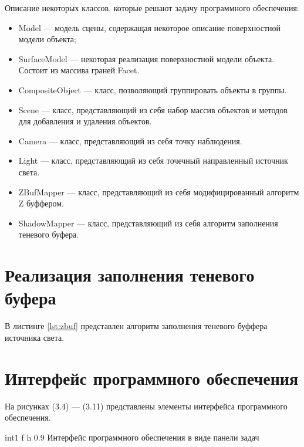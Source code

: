 Описание некоторых классов, которые решают задачу программного обеспечения:
\begin{itemize}
    \item Model --- модель сцены, содержащая некоторое описание поверхностной модели объекта;
    \item SurfaceModel --- некоторая реализация поверхностной модели объекта. Состоит из
        массива граней Facet.
    \item CompositeObject --- класс, позволяющий группировать объекты в группы.
    \item Scene --- класс, представляющий из себя набор массив объектов и методов для
        добавления и удаления объектов.
    \item Camera --- класс, представляющий из себя точку наблюдения.
    \item Light --- класс, представляющий из себя точечный направленный источник света.
    \item ZBufMapper --- класс, представляющий из себя модифицированный алгоритм Z буффером.
    \item ShadowMapper --- класс, представляющий из себя алгоритм заполнения теневого буфера.
\end{itemize}


\section{Реализация заполнения теневого буфера}

В листинге \ref{lst:zbuf} представлен алгоритм заполнения теневого буффера
источника света.

\newpage

\begin{center}
\captionsetup{justification=raggedright,singlelinecheck=off}

\end{center}

\section{Интерфейс программного обеспечения}

На рисунках (3.4) --- (3.11) представлены элементы интерфейса программного обеспечения.

{int1}
{f}
{h}
{0.9\textwidth}
{Интерфейс программного обеспечения в виде панели задач}


